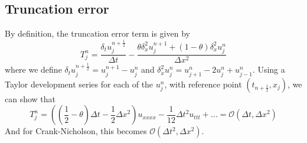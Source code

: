 \documentclass[12pt, openany]{report}
\theoremstyle{definition}
\begin{document}
\subsection{Truncation error}
By definition, the truncation error term is given by
\begin{equation}
	T^n_j = \frac{\delta_t u_j^{n+\frac{1}{2}}}{\Delta t} - \frac{\theta \delta_x^2u_j^{n+1} + (1-\theta)\delta_x^2u_j^n}{\Delta x^2}
\end{equation}
where we define $\delta_tu_j^{n+\frac{1}{2}}=u_j^{n+1}-u_j^n$ and $\delta_x^2u_j^n = u_{j+1}^n - 2 u_j^n + u_{j-1}^n$. Using a Taylor development series for each of the $u_j^n$, with reference point $(t_{n+\frac{1}{2}}, x_j)$, we can show that 
\begin{equation}
	T^n_j = \left(\left(\frac{1}{2}-\theta\right)\Delta t-\frac{1}{2}\Delta x^2\right) u_{xxxx} -\frac{1}{12}\Delta t^2u_{ttt} + \dots = \mathcal{O}(\Delta t, \Delta x^2)
\end{equation}
And for Crank-Nicholson, this becomes $\mathcal{O}(\Delta t^2, \Delta x^2)$. 
\end{document}
